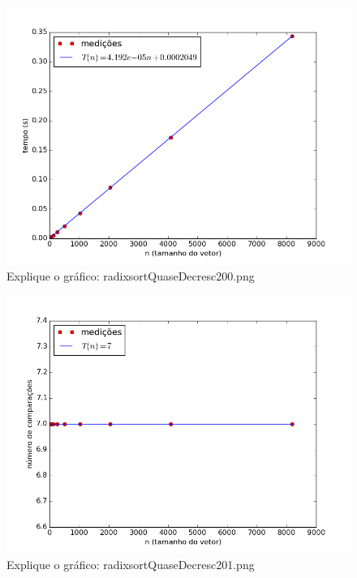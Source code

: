\documentclass[12pt,a4paper,twoside]{report}
\begin{document}


\begin{figure}[ht]
\centering \includegraphics[scale=0.8]{../radixsort/imagens/radixsortQuaseDecresc200.png}
\caption{Explique o gráfico: radixsortQuaseDecresc200.png}
\label{fig:radixsortQuaseDecresc200}
\end{figure}

\begin{figure}[ht]
\centering \includegraphics[scale=0.8]{../radixsort/imagens/radixsortQuaseDecresc201.png}
\caption{Explique o gráfico: radixsortQuaseDecresc201.png}
\label{fig:radixsortQuaseDecresc201}
\end{figure}
\end{document}
